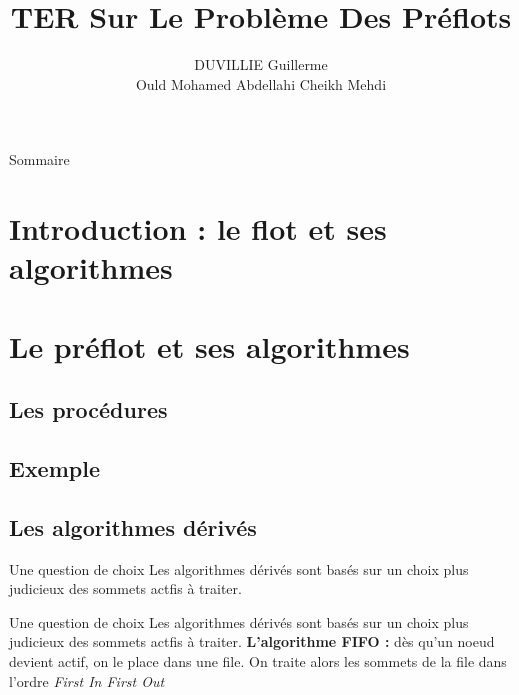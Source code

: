 \documentclass[hyperref={},
xcolor={dvipsnames,svgnames,table},10pt]{beamer}
\title{TER Sur Le Problème Des Préflots}
\author{DUVILLIE Guillerme \\ Ould Mohamed Abdellahi Cheikh Mehdi}
\institute{Université Montpellier2\\ Master1-Informatique\\ Spécialité-MOCA}
\begin{document}
\begin{frame}
	\titlepage 
\end{frame}


\begin{frame}{Sommaire}
  \tableofcontents
\end{frame} 

\section{Introduction : le flot et ses algorithmes}



\section{Le préflot et ses algorithmes}



\subsection{Les procédures}



\subsection{Exemple}


\subsection{Les algorithmes dérivés}

\begin{frame}{Une question de choix}
	Les algorithmes dérivés sont basés sur un choix plus judicieux des sommets actfis à traiter.
	\vfill
\end{frame}

\begin{frame}{Une question de choix}
	Les algorithmes dérivés sont basés sur un choix plus judicieux des sommets actfis à traiter.
	\vfill
	\textbf{L'algorithme FIFO :} dès qu'un noeud devient actif, on le place dans une file. On traite
	alors les sommets de la file dans l'ordre \emph{First In First Out}\vfill
\end{frame}
\end{document}
